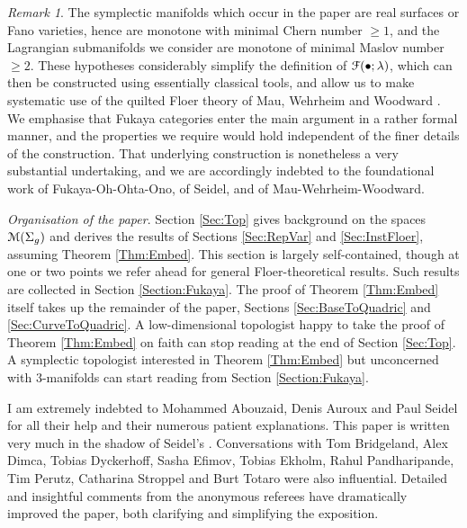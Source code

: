 \documentclass[reqno,10pt]{amsart}
\numberwithin{equation}{section}
\newcommand{\scrF}{\EuScript{F}}
\newcommand{\scrM}{\EuScript{M}}
\theoremstyle{remark}
\newtheorem{Remark}[thm]{Remark}
\newcommand{\Acknowledgements}{{\em Acknowledgements.} }
\begin{document}
\begin{Remark} \label{Rem:OurSpacesAreMonotone}
The symplectic manifolds which occur in the paper are real surfaces or Fano varieties, hence are monotone with minimal Chern number $\geq 1$, and the Lagrangian submanifolds we consider are monotone of minimal Maslov number $\geq 2$.  These hypotheses considerably simplify the definition of $\scrF(\bullet; \lambda)$, which can then be constructed using essentially classical tools, and allow us to make systematic use of the quilted Floer theory of Mau, Wehrheim and Woodward \cite{MWW:Announce}. We emphasise that Fukaya categories  enter the main argument in a rather formal manner, and the properties we require would hold independent of the finer details of the construction. That underlying construction is nonetheless a  very substantial undertaking, and we are accordingly indebted to the foundational work of Fukaya-Oh-Ohta-Ono, of Seidel, and of Mau-Wehrheim-Woodward.  \end{Remark}

\begin{small}
\noindent \emph{Organisation of the paper}.  Section \ref{Sec:Top} gives background on the spaces $\scrM(\Sigma_g)$ and derives  the results of Sections \ref{Sec:RepVar} and \ref{Sec:InstFloer}, assuming Theorem \ref{Thm:Embed}.   This section is largely self-contained, though at one or two points we refer ahead for general Floer-theoretical results.  Such results are collected in  Section \ref{Section:Fukaya}.  The proof of Theorem \ref{Thm:Embed} itself takes up the remainder of the paper, Sections \ref{Sec:BaseToQuadric} and \ref{Sec:CurveToQuadric}.  A low-dimensional topologist happy to take the proof of Theorem \ref{Thm:Embed} on faith can stop reading at the end of Section \ref{Sec:Top}. A symplectic topologist interested in Theorem \ref{Thm:Embed} but unconcerned with 3-manifolds can start reading from Section \ref{Section:Fukaya}.
\end{small}

\vspace{0.5cm}

\noindent \Acknowledgements  I am extremely indebted to Mohammed Abouzaid, Denis Auroux and Paul Seidel for all their help and their numerous patient explanations. This paper is written very much in the shadow of Seidel's \cite{Seidel:HMSgenus2}.  Conversations with Tom Bridgeland, Alex Dimca, Tobias Dyckerhoff, Sasha Efimov, Tobias Ekholm, Rahul Pandharipande, Tim Perutz, Catharina Stroppel and Burt Totaro were also influential.  Detailed and insightful comments from the anonymous referees have dramatically improved the paper,  both clarifying and simplifying the exposition. \newline 
\end{document}

